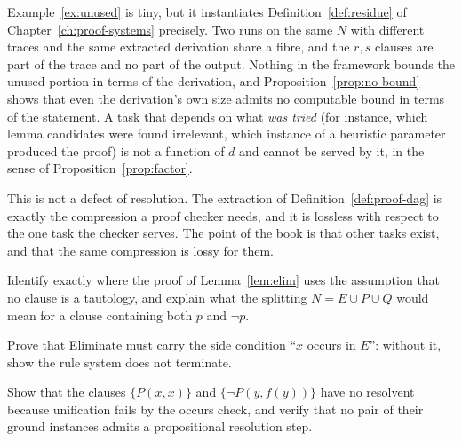 Example~\ref{ex:unused} is tiny, but it instantiates Definition~\ref{def:residue} of Chapter~\ref{ch:proof-systems} precisely. Two runs on the same $N$ with different traces and the same extracted derivation share a fibre, and the $r,s$ clauses are part of the trace and no part of the output. Nothing in the framework bounds the unused portion in terms of the derivation, and Proposition~\ref{prop:no-bound} shows that even the derivation's own size admits no computable bound in terms of the statement. A task that depends on what \emph{was tried} (for instance, which lemma candidates were found irrelevant, which instance of a heuristic parameter produced the proof) is not a function of $d$ and cannot be served by it, in the sense of Proposition~\ref{prop:factor}.

This is not a defect of resolution. The extraction of Definition~\ref{def:proof-dag} is exactly the compression a proof checker needs, and it is lossless with respect to the one task the checker serves. The point of the book is that other tasks exist, and that the same compression is lossy for them.

\begin{exercise}
Identify exactly where the proof of Lemma~\ref{lem:elim} uses the assumption that no clause is a tautology, and explain what the splitting $N=E\cup P\cup Q$ would mean for a clause containing both $p$ and $\neg p$.
\end{exercise}

\begin{exercise}
Prove that \textsf{Eliminate} must carry the side condition ``$x$ occurs in $E$'': without it, show the rule system does not terminate.
\end{exercise}

\begin{exercise}
Show that the clauses $\{P(x,x)\}$ and $\{\neg P(y,f(y))\}$ have no resolvent because unification fails by the occurs check, and verify that no pair of their ground instances admits a propositional resolution step.
\end{exercise}

